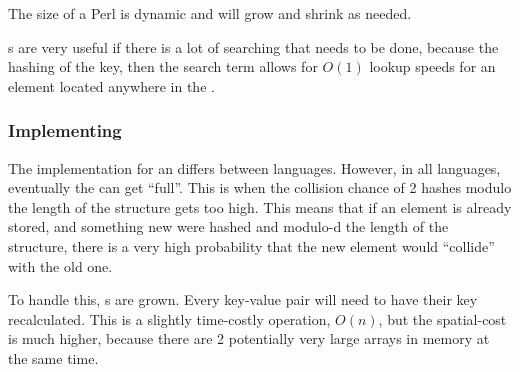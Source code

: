The size of a Perl  is dynamic and will grow and shrink as needed.

s are very useful if there is a lot of searching that needs to be done, because the hashing of the key, then the search term allows for $O(1)$ lookup speeds for an element located anywhere in the .

\subsubsection{Implementing }\label{subsubsec:Implementing_Associative_Arrays}
The implementation for an  differs between languages.
However, in all languages, eventually the  can get ``full''.
This is when the collision chance of 2 hashes modulo the length of the structure gets too high.
This means that if an element is already stored, and something new were hashed and modulo-d the length of the structure, there is a very high probability that the new element would ``collide'' with the old one.

To handle this, s are grown.
Every key-value pair will need to have their key recalculated.
This is a slightly time-costly operation, $O(n)$, but the spatial-cost is much higher, because there are 2 potentially very large arrays in memory at the same time.

